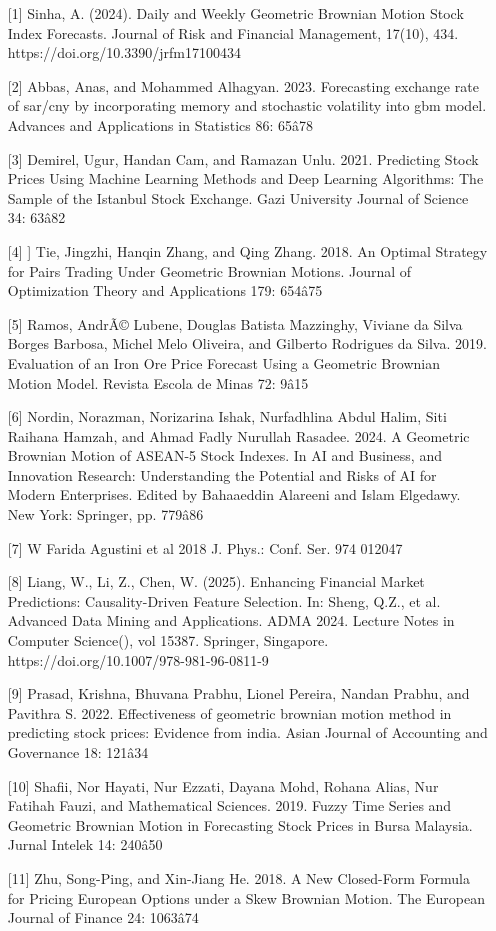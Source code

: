 \begin{talk}
\begin{enumerate}
	\item[{[1]}] Sinha, A. (2024). Daily and Weekly Geometric Brownian Motion Stock Index Forecasts. Journal of Risk and Financial Management, 17(10), 434. https://doi.org/10.3390/jrfm17100434
	\item[{[2]}] Abbas, Anas, and Mohammed Alhagyan. 2023. Forecasting exchange rate of sar/cny by incorporating memory and stochastic volatility into gbm model. Advances and Applications in Statistics 86: 65â78
    \item[{[3]}] Demirel, Ugur, Handan Cam, and Ramazan Unlu. 2021. Predicting Stock Prices Using Machine Learning Methods and Deep Learning Algorithms: The Sample of the Istanbul Stock Exchange. Gazi University Journal of Science 34: 63â82
    \item[{[4]}]] Tie, Jingzhi, Hanqin Zhang, and Qing Zhang. 2018. An Optimal Strategy for Pairs Trading Under Geometric Brownian Motions. Journal of Optimization Theory and Applications 179: 654â75
    \item[{[5]}] Ramos, AndrÃ© Lubene, Douglas Batista Mazzinghy, Viviane da Silva Borges Barbosa, Michel Melo Oliveira, and Gilberto Rodrigues da Silva. 2019. Evaluation of an Iron Ore Price Forecast Using a Geometric Brownian Motion Model. Revista Escola de Minas 72: 9â15
    \item[{[6]}] Nordin, Norazman, Norizarina Ishak, Nurfadhlina Abdul Halim, Siti Raihana Hamzah, and Ahmad Fadly Nurullah Rasadee. 2024. A Geometric Brownian Motion of ASEAN-5 Stock Indexes. In AI and Business, and Innovation Research: Understanding the Potential and Risks of AI for Modern Enterprises. Edited by Bahaaeddin Alareeni and Islam Elgedawy. New York: Springer, pp. 779â86
    \item[{[7]}]W Farida Agustini et al 2018 J. Phys.: Conf. Ser. 974 012047
    \item[{[8]}] Liang, W., Li, Z., Chen, W. (2025). Enhancing Financial Market Predictions: Causality-Driven Feature Selection. In: Sheng, Q.Z., et al. Advanced Data Mining and Applications. ADMA 2024. Lecture Notes in Computer Science(), vol 15387. Springer, Singapore. https://doi.org/10.1007/978-981-96-0811-9
    \item[{[9]}] Prasad, Krishna, Bhuvana Prabhu, Lionel Pereira, Nandan Prabhu, and Pavithra S. 2022. Effectiveness of geometric brownian motion method in predicting stock prices: Evidence from india. Asian Journal of Accounting and Governance 18: 121â34
    \item[{[10]}] Shafii, Nor Hayati, Nur Ezzati, Dayana Mohd, Rohana Alias, Nur Fatihah Fauzi, and Mathematical Sciences. 2019. Fuzzy Time Series and Geometric Brownian Motion in Forecasting Stock Prices in Bursa Malaysia. Jurnal Intelek 14: 240â50
    \item[{[11]}] Zhu, Song-Ping, and Xin-Jiang He. 2018. A New Closed-Form Formula for Pricing European Options under a Skew Brownian Motion. The European Journal of Finance 24: 1063â74
\end{enumerate}

\end{talk}

